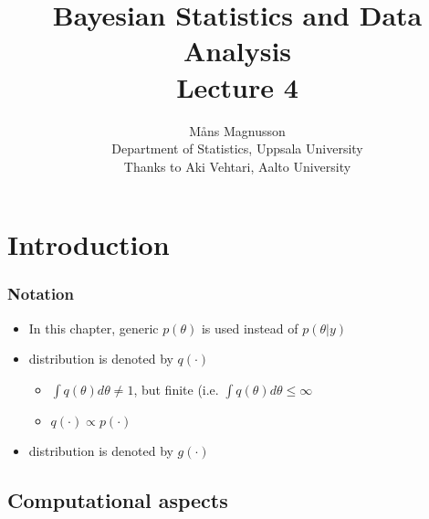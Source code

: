 \documentclass[10pt]{beamer}
\title[]{{\color{black}Bayesian Statistics and Data Analysis \\ Lecture 4}}
\author[]{M{\aa}ns Magnusson \\ Department of Statistics, Uppsala University \\ Thanks to Aki Vehtari, Aalto University}
\date{}
\begin{document}
\frame{\titlepage
}





\section{Introduction}

\begin{frame}

\frametitle{Notation}

  \begin{itemize}
  \item In this chapter, generic $p(\theta)$ is used instead of
    $p(\theta|y)$
    \pause
  \item {} distribution is denoted by $q(\cdot)$
    \begin{itemize}
    \item $\int q(\theta) d\theta \neq 1$, but finite (i.e. $\int q(\theta) d\theta \le \infty$
    \item $q(\cdot) \propto p(\cdot)$
    \end{itemize}
    \pause
  \item {} distribution is denoted by $g(\cdot)$
  \end{itemize}

\end{frame}

\subsection{Computational aspects}
\end{document}
